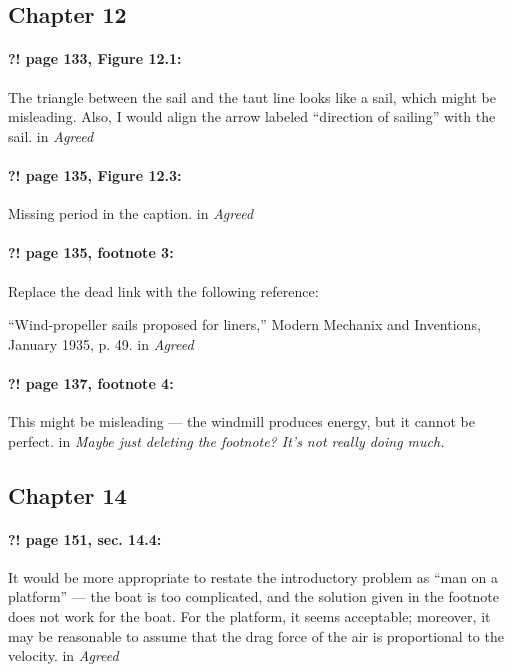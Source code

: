 \documentclass[twoside]{article}
\begin{document}
\subsection*{Chapter 12}

\paragraph{?! page 133, Figure 12.1:} The triangle between the sail and the taut line looks like a sail, which might be misleading. Also, I would align the arrow labeled ``direction of sailing'' with the sail.
 in {\it  Agreed} 

\paragraph{?! page 135, Figure 12.3:} Missing period in the caption.
 in {\it  Agreed} 

\paragraph{?! page 135, footnote 3:} Replace the dead link with the following reference:

``Wind-propeller sails proposed for liners,'' Modern Mechanix and Inventions, January 1935, p. 49.
 in {\it  Agreed} 

\paragraph{?! page 137, footnote 4:} This might be misleading — the windmill produces energy, but it cannot be perfect.
 in {\it  Maybe just deleting the footnote? It's not really doing much.} 

\subsection*{Chapter 14}

\paragraph{?! page 151, sec. 14.4:} It would be more appropriate to restate the introductory problem as ``man on a platform'' — the boat is too complicated, and the solution given in the footnote does not work for the boat. For the platform, it seems acceptable; moreover, it may be reasonable to assume that the drag force of the air is proportional to the velocity.
 in {\it  Agreed} 
\end{document}
